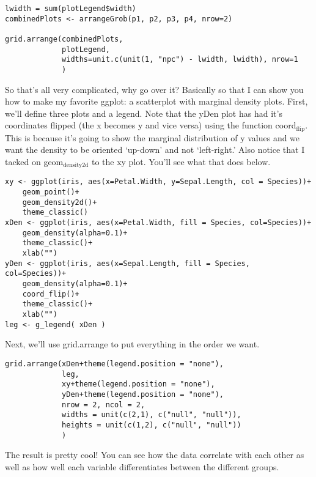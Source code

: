 \documentclass[11pt]{article}
\begin{document}
\begin{verbatim}
lwidth = sum(plotLegend$width)
combinedPlots <- arrangeGrob(p1, p2, p3, p4, nrow=2)

grid.arrange(combinedPlots,
             plotLegend, 
             widths=unit.c(unit(1, "npc") - lwidth, lwidth), nrow=1
             )
\end{verbatim}


So that's all very complicated, why go over it? Basically so that I can
show you how to make my favorite ggplot: a scatterplot with marginal
density plots. First, we'll define three plots and a legend. Note that
the yDen plot has had it's coordinates flipped (the x becomes y and
vice versa) using the function coord$_{\mathrm{flip}}$. This is because it's going
to show the marginal distribution of y values and we want the density
to be oriented `up-down' and not `left-right.' Also notice that I
tacked on geom$_{\mathrm{density2d}}$ to the xy plot. You'll see what that does below.

\begin{verbatim}
xy <- ggplot(iris, aes(x=Petal.Width, y=Sepal.Length, col = Species))+
    geom_point()+
    geom_density2d()+
    theme_classic()
xDen <- ggplot(iris, aes(x=Petal.Width, fill = Species, col=Species))+
    geom_density(alpha=0.1)+
    theme_classic()+
    xlab("")
yDen <- ggplot(iris, aes(x=Sepal.Length, fill = Species, col=Species))+
    geom_density(alpha=0.1)+
    coord_flip()+
    theme_classic()+
    xlab("")
leg <- g_legend( xDen )
\end{verbatim}

Next, we'll use grid.arrange to put everything in the order we want.

\begin{verbatim}
grid.arrange(xDen+theme(legend.position = "none"),
             leg,
             xy+theme(legend.position = "none"),
             yDen+theme(legend.position = "none"),
             nrow = 2, ncol = 2,
             widths = unit(c(2,1), c("null", "null")),
             heights = unit(c(1,2), c("null", "null"))
             )
\end{verbatim}


The result is pretty cool! You can see how the data correlate with
each other as well as how well each variable differentiates between
the different groups.
\end{document}
